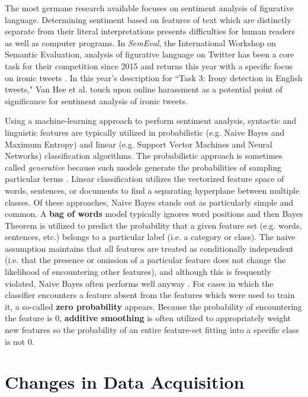 \documentclass[11pt, twoside, reqno]{book}
\begin{document}
The most germane research available focuses on sentiment analysis of figurative language. Determining sentiment based on features of text which are distinctly separate from their literal interpretations presents difficulties for human readers as well as computer programs. In \textit{SemEval}, the International Workshop on Semantic Evaluation, analysis of figurative language on Twitter has been a core task for their competition since 2015 \cite{semeval_2015} and returns this year with a specific focus on ironic tweets \cite{semeval_2018}. In this year's description for ``Task 3: Irony detection in English tweets," Van Hee et al. touch upon online harassment as a potential point of significance for sentiment analysis of ironic tweets. 

Using a machine-learning approach to perform sentiment analysis, syntactic and linguistic features are typically utilized in probabilistic (e.g. Naive Bayes and Maximum Entropy) and linear (e.g. Support Vector Machines and Neural Networks) classification algorithms. The probabilistic approach is sometimes called \textit{generative} because such models generate the probabilities of sampling particular terms \cite{sentiment_survey}. Linear classification utilizes the vectorized feature space of words, sentences, or documents to find a separating hyperplane between multiple classes. Of these approaches, Naive Bayes stands out as particularly simple and common. A \textbf{bag of words} model typically ignores word positions and then Bayes Theorem is utilized to predict the probability that a given feature set (e.g. words, sentences, etc.) belongs to a particular label (i.e. a category or class). The naive assumption maintains that all features are treated as conditionally independent (i.e. that the presence or omission of a particular feature does not change the likelihood of encountering other features), and although this is frequently violated, Naive Bayes often performs well anyway \cite{naive_bayes_optimality}. For cases in which the classifier encounters a feature absent from the features which were used to train it, a so-called \textbf{zero probability} appears. Because the probability of encountering the feature is $0$, \textbf{additive smoothing} is often utilized to appropriately weight new features so the probability of an entire feature-set fitting into a specific class is not $0$.

\section{Changes in Data Acquisition}
\label{changes_in_data}
\end{document}
